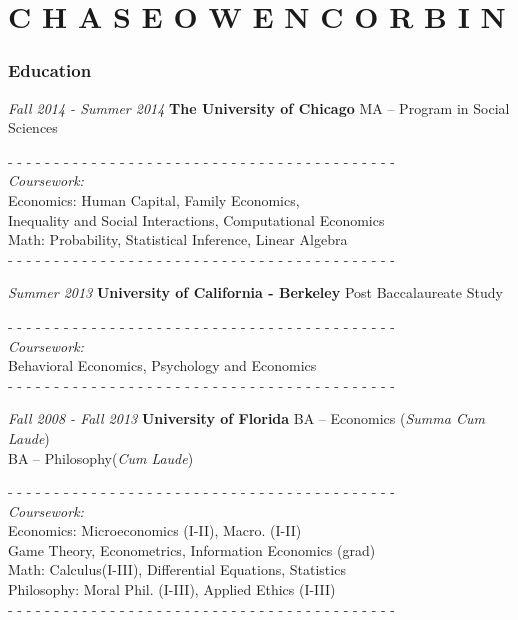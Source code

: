 \documentclass[fontsize=8pt]{ChaseCV}
\begin{document}
\part{C H A S E \quad O W E N \quad C O R B I N}

\section{Education}

\begin{eventlist}

\item{\textit{Fall 2014 - Summer 2014}}
	{\textbf{The University of Chicago}}
	{MA -- Program in Social Sciences}

- - - - - - - - - - - - - - - - - - - - - - - - - - - - - - - - - - - - - - - - - - \\
\textit{Coursework:} \\
\textbullet{} Economics: Human Capital, Family Economics, \\
Inequality and Social Interactions, Computational Economics \\
\textbullet{} Math: Probability, Statistical Inference, Linear Algebra \\
- - - - - - - - - - - - - - - - - - - - - - - - - - - - - - - - - - - - - - - - - - \\

\item{\textit{Summer 2013}}
	{\textbf{University of California - Berkeley}}
	{Post Baccalaureate Study}

- - - - - - - - - - - - - - - - - - - - - - - - - - - - - - - - - - - - - - - - - - \\
\textit{Coursework:} \\
\textbullet{}Behavioral Economics, Psychology and Economics \\
- - - - - - - - - - - - - - - - - - - - - - - - - - - - - - - - - - - - - - - - - - \\

\item{\textit{Fall 2008 - Fall 2013}}
	{\textbf{University of Florida}}
	{BA --  Economics (\textit{Summa Cum Laude}) \\
	BA -- Philosophy(\textit{Cum Laude})}

- - - - - - - - - - - - - - - - - - - - - - - - - - - - - - - - - - - - - - - - - - \\
\textit{Coursework:} \\
\textbullet{} Economics: Microeconomics (I-II), Macro. (I-II) \\
Game Theory, Econometrics, Information Economics (grad) \\
\textbullet{} Math: Calculus(I-III), Differential Equations, Statistics \\
\textbullet{} Philosophy: Moral Phil. (I-III), Applied Ethics (I-III) \\
- - - - - - - - - - - - - - - - - - - - - - - - - - - - - - - - - - - - - - - - - - \\
\end{eventlist}
\end{document}
